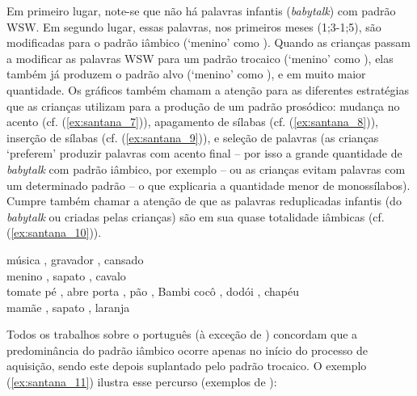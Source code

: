 \documentclass[output=paper]{LSP/langsci}
\begin{document}
Em primeiro lugar, note-se que não há palavras infantis (\textit{babytalk}) com padrão WSW. Em segundo lugar, essas palavras, nos primeiros meses (1;3-1;5), são modificadas para o padrão iâmbico (`menino' como \ipa{[mi\pstr ni]}). Quando as crianças passam a modificar as palavras WSW para um padrão trocaico (`menino' como ), elas também já produzem o padrão alvo (`menino' como \ipa{[mi\pstr ni.nu]}), e em muito maior quantidade.
 Os gráficos também chamam a atenção para as diferentes estratégias que as crianças utilizam para a produção de um padrão prosódico: mudança no acento (cf. (\ref{ex:santana_7})), apagamento de sílabas (cf. (\ref{ex:santana_8})), inserção de sílabas (cf. (\ref{ex:santana_9})), e seleção de palavras (as crianças `preferem' produzir palavras com acento final – por isso a grande quantidade de \textit{babytalk} com padrão iâmbico, por exemplo – ou as crianças evitam palavras com um determinado padrão – o que explicaria a quantidade menor de monossílabos). Cumpre também chamar a atenção de que as palavras reduplicadas infantis (do \textit{babytalk} ou criadas pelas crianças) são em sua quase totalidade iâmbicas (cf. (\ref{ex:santana_10})).
 
\ea\label{ex:santana_7}
música \ipa{[mu.\pstr zi.ka]}, gravador ,  cansado \ipa{[k\~{a}.sa.\pstr du]}\\
\z
\ea\label{ex:santana_8}
menino \ipa{[mi\pstr ni]} , sapato \ipa{[pa\pstr pa]}, cavalo \\
tomate 
\z
\ea\label{ex:santana_9}
pé \ipa{[u\pstr pE]} \ipa{[ti\pstr pa]}, abre 
porta , pão \ipa{[5\pstr p5]}, Bambi \ipa{[5\pstr b5]}
\z
\ea\label{ex:santana_10}
cocô \ipa{[ko\pstr ko]}, dodói  , chapéu \\
mamãe \ipa{[m5.\pstr m\~{5}]}, sapato \ipa{[p5\pstr p5]}, laranja \\
\z

Todos os trabalhos sobre o português (à exceção de \citealt{rapp1994}) concordam que a predominância do padrão iâmbico ocorre apenas no início do processo de aquisição, sendo este depois suplantado pelo padrão trocaico. O exemplo (\ref{ex:santana_11}) ilustra esse percurso (exemplos de \citealt{santos2007}):
\end{document}

